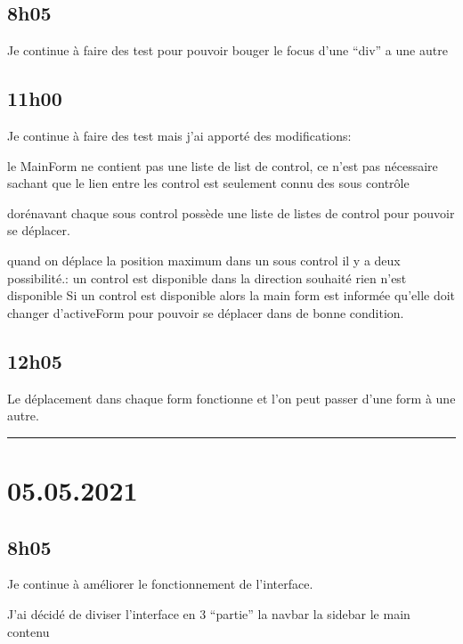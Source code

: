 \documentclass[a4paper,12pt,french]{sphinxmanual}
\begin{document}
\subsection{8h05}
\label{\detokenize{logbook:id67}}
\sphinxAtStartPar
Je continue à faire des test pour pouvoir bouger le focus d’une “div” a une autre


\subsection{11h00}
\label{\detokenize{logbook:id68}}
\sphinxAtStartPar
Je continue à faire des test mais j’ai apporté des modifications:

\sphinxAtStartPar
le MainForm ne contient pas une liste de list de control, ce n’est pas nécessaire sachant que le lien entre les control est seulement connu des sous contrôle

\sphinxAtStartPar
dorénavant chaque sous control possède une liste de listes de control pour pouvoir se déplacer.

\sphinxAtStartPar
quand on déplace la position maximum dans un sous control il y a deux possibilité.:
un control est disponible dans la direction souhaité
rien n’est disponible
Si un control est disponible alors la main form est informée qu’elle doit changer d’activeForm pour pouvoir se déplacer dans de bonne condition.


\subsection{12h05}
\label{\detokenize{logbook:id69}}
\sphinxAtStartPar
Le déplacement dans chaque form fonctionne et l’on peut passer d’une form à une autre.


\bigskip\hrule\bigskip



\section{05.05.2021}
\label{\detokenize{logbook:id70}}

\subsection{8h05}
\label{\detokenize{logbook:id71}}
\sphinxAtStartPar
Je continue à améliorer le fonctionnement de l’interface.

\sphinxAtStartPar
J’ai décidé de diviser l’interface en 3 “partie”
la navbar
la sidebar
le main contenu
\end{document}
